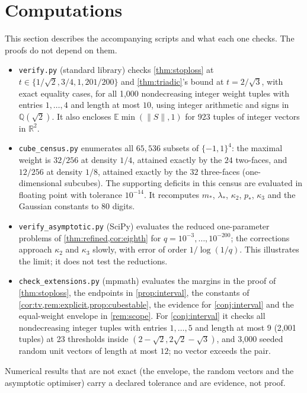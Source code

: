 \documentclass[11pt,a4paper]{article}
\numberwithin{equation}{section}
\theoremstyle{remark}
\newcommand{\E}{\mathbb E}
\newcommand{\R}{\mathbb R}
\begin{document}
\section{Computations}\label{sec:computations}

This section describes the accompanying scripts and what each one checks.
The proofs do not depend on them.

\begin{itemize}[leftmargin=1.5em]
\item \texttt{verify.py} (standard library) checks \cref{thm:stoploss} at
 $t\in\{1/\sqrt2,3/4,1,201/200\}$ and \cref{thm:triadic}'s bound at
 $t=2/\sqrt3$, with exact equality cases, for all 1{,}000 nondecreasing
 integer weight tuples with entries $1,\ldots,4$ and length at most $10$,
 using integer arithmetic and signs in $\mathbb Q(\sqrt2)$. It also encloses
 $\E\min(\|S\|,1)$ for 923 tuples of integer vectors in $\R^2$.
\item \texttt{cube\_census.py} enumerates all $65{,}536$ subsets of
 $\{-1,1\}^4$: the maximal weight is $32/256$ at density $1/4$, attained
 exactly by the $24$ two-faces, and $12/256$ at density $1/8$, attained
 exactly by the $32$ three-faces (one-dimensional subcubes). The supporting
 deficits in this census are evaluated in floating point with tolerance
 $10^{-14}$. It recomputes $m_*$, $\lambda_*$,
 $\kappa_2$, $p_*$, $\kappa_3$ and the Gaussian constants to 80 digits.
\item \texttt{verify\_asymptotic.py} (SciPy) evaluates the reduced
 one-parameter problems of \cref{thm:refined,cor:eighth} for
 $q=10^{-3},\ldots,10^{-200}$; the corrections approach $\kappa_2$ and
 $\kappa_3$ slowly, with error of order $1/\log(1/q)$. This illustrates
 the limit; it does not test the reductions.
\item \texttt{check\_extensions.py} (mpmath) evaluates the margins in the
 proof of \cref{thm:stoploss}, the endpoints in \cref{prop:interval}, the
 constants of \cref{cor:tv,rem:explicit,prop:cubestable}, the evidence for
 \cref{conj:interval} and the equal-weight envelope in \cref{rem:scope}.
 For \cref{conj:interval} it checks all nondecreasing integer tuples with
 entries $1,\ldots,5$ and length at most $9$ (2{,}001 tuples) at 23
 thresholds inside $(2-\sqrt2,2\sqrt2-\sqrt3)$, and 3{,}000 seeded random
 unit vectors of length at most $12$; no vector exceeds the pair.
\end{itemize}
Numerical results that are not exact (the envelope, the random vectors and
the asymptotic optimiser) carry a declared tolerance and are evidence, not
proof.
\end{document}
